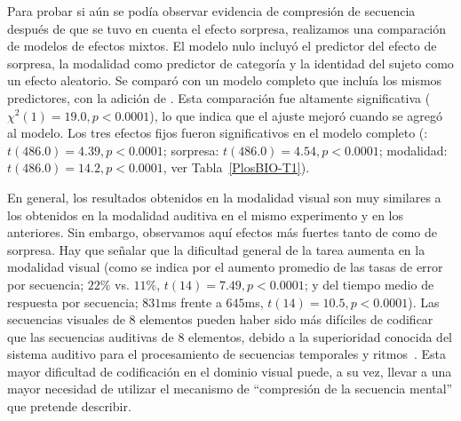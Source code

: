 Para probar si aún se podía observar evidencia de compresión de secuencia después de que se tuvo en cuenta el efecto sorpresa, realizamos una comparación de modelos de efectos mixtos. El modelo nulo incluyó el predictor del efecto de sorpresa, la modalidad como predictor de categoría y la identidad del sujeto como un efecto aleatorio. Se comparó con un modelo completo que incluía los mismos predictores, con la adición de \mdlbin. Esta comparación fue altamente significativa ($\chi^2 (1) = 19.0, p < 0.0001$), lo que indica que el ajuste mejoró cuando se agregó \mdlbin al modelo. Los tres efectos fijos fueron significativos en el modelo completo (\mdlbin: $t (486.0) = 4.39, p < 0.0001$; sorpresa: $t (486.0) = 4.54, p < 0.0001$; modalidad: $t (486.0) = 14.2, p <0.0001$, ver Tabla~\ref{PlosBIO-T1}).


En general, los resultados obtenidos en la modalidad visual son muy similares a los obtenidos en la modalidad auditiva en el mismo experimento y en los anteriores. Sin embargo, observamos aquí efectos más fuertes tanto de \mdlbin como de sorpresa. Hay que señalar que la dificultad general de la tarea aumenta en la modalidad visual (como se indica por el aumento promedio de las tasas de error por secuencia; $22\%$ vs. $11 \%$, $t (14) = 7.49, p < 0.0001$; y del tiempo medio de respuesta por secuencia; $831$ms frente a $645$ms, $t(14) = 10.5, p < 0.0001$). Las secuencias visuales de 8 elementos pueden haber sido más difíciles de codificar que las secuencias auditivas de 8 elementos, debido a la superioridad conocida del sistema auditivo para el procesamiento de secuencias temporales y ritmos~\cite{f90,f92}. Esta mayor dificultad de codificación en el dominio visual puede, a su vez, llevar a una mayor necesidad de utilizar el mecanismo de ``compresión de la secuencia mental'' que \grambin pretende describir.

